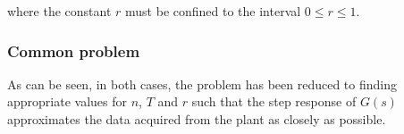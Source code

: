 where the constant $r$ must be confined to the interval $0 \leq r \le 1$.


\subsubsection*{Common problem}

As can be  seen,  in  both  cases,  the  problem  has  been  reduced  to finding
appropriate values for  $n$,  $T$  and $r$ such that the step response of $G(s)$
approximates  the  data  acquired  from  the  plant   as  closely  as  possible.


